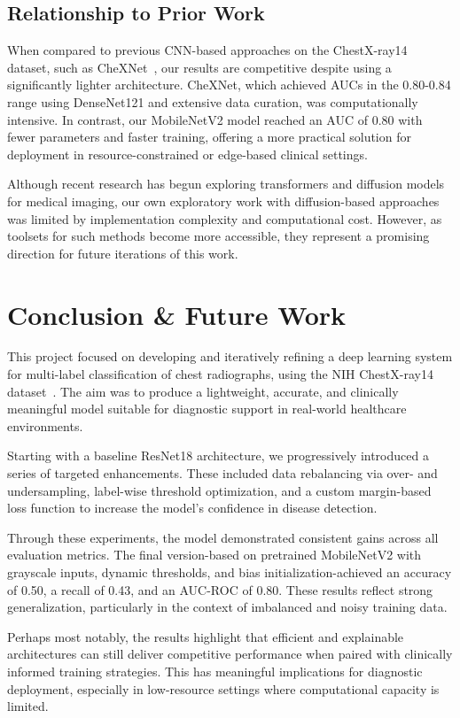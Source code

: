 \documentclass[12pt]{article}
\begin{document}
\begin{multicols}{2}
\subsection{Relationship to Prior Work}
When compared to previous CNN-based approaches on the ChestX-ray14 dataset, such as CheXNet~\cite{irvin2019chexpert}, our results are competitive despite using a significantly lighter architecture. CheXNet, which achieved AUCs in the 0.80-0.84 range using DenseNet121 and extensive data curation, was computationally intensive. In contrast, our MobileNetV2 model reached an AUC of 0.80 with fewer parameters and faster training, offering a more practical solution for deployment in resource-constrained or edge-based clinical settings.

Although recent research has begun exploring transformers and diffusion models for medical imaging, our own exploratory work with diffusion-based approaches was limited by implementation complexity and computational cost. However, as toolsets for such methods become more accessible, they represent a promising direction for future iterations of this work.


\section{Conclusion \& Future Work}

This project focused on developing and iteratively refining a deep learning system for multi-label classification of chest radiographs, using the NIH ChestX-ray14 dataset~\cite{wang2017chestx}. The aim was to produce a lightweight, accurate, and clinically meaningful model suitable for diagnostic support in real-world healthcare environments.

Starting with a baseline ResNet18 architecture, we progressively introduced a series of targeted enhancements. These included data rebalancing via over- and undersampling, label-wise threshold optimization, and a custom margin-based loss function to increase the model's confidence in disease detection.

Through these experiments, the model demonstrated consistent gains across all evaluation metrics. The final version-based on pretrained MobileNetV2 with grayscale inputs, dynamic thresholds, and bias initialization-achieved an accuracy of 0.50, a recall of 0.43, and an AUC-ROC of 0.80. These results reflect strong generalization, particularly in the context of imbalanced and noisy training data.

Perhaps most notably, the results highlight that efficient and explainable architectures can still deliver competitive performance when paired with clinically informed training strategies. This has meaningful implications for diagnostic deployment, especially in low-resource settings where computational capacity is limited.


\end{multicols}
\end{document}
